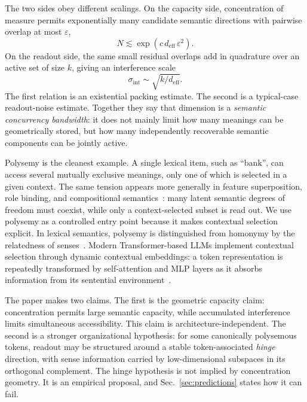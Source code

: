\documentclass[
  aps,
  reprint,
  superscriptaddress,
  floatfix,
  nofootinbib,
  longbibliography
]{revtex4-2}
\newcommand{\deff}{d_{\mathrm{eff}}}
\newcommand{\sint}{\sigma_{\mathrm{int}}}
\begin{document}
The two sides obey different scalings. On the capacity side,
concentration of measure permits exponentially many candidate semantic
directions with pairwise overlap at most $\varepsilon$,
%
\begin{equation}
\label{eq:intro-capacity}
N\lesssim \exp(c\,\deff\,\varepsilon^{2}).
\end{equation}
%
On the readout side, the same small residual overlaps add in quadrature
over an active set of size $k$, giving an interference scale
%
\begin{equation}
\label{eq:intro-readout}
\sint\sim\sqrt{k/\deff}.
\end{equation}
%
The first relation is an existential packing estimate. The second is a
typical-case readout-noise estimate. Together they say that dimension
is a \emph{semantic concurrency bandwidth}: it does not mainly limit how
many meanings can be geometrically stored, but how many independently
recoverable semantic components can be jointly active.

Polysemy is the cleanest example. A single lexical item, such as
``bank'', can access several mutually exclusive meanings, only one of
which is selected in a given context. The same tension appears more
generally in feature superposition, role binding, and compositional
semantics~\cite{mikolov2013}: many latent semantic degrees of freedom
must coexist, while only a context-selected subset is read out. We use
polysemy as a controlled entry point because it makes contextual
selection explicit. In lexical semantics, polysemy is distinguished
from homonymy by the relatedness of senses~\cite{pustejovsky1995}.
Modern Transformer-based LLMs implement contextual selection through
dynamic contextual embeddings: a token representation is repeatedly
transformed by self-attention and MLP layers as it absorbs information
from its sentential environment~\cite{Vaswani-2017-Attention}.

The paper makes two claims. The first is the geometric capacity claim:
concentration permits large semantic capacity, while accumulated
interference limits simultaneous accessibility. This claim is
architecture-independent. The second is a stronger organizational
hypothesis: for some canonically polysemous tokens, readout may be
structured around a stable token-associated \emph{hinge} direction,
with sense information carried by low-dimensional subspaces in its
orthogonal complement. The hinge hypothesis is not implied by
concentration geometry. It is an empirical proposal, and
Sec.~\ref{sec:predictions} states how it can fail.
\end{document}
